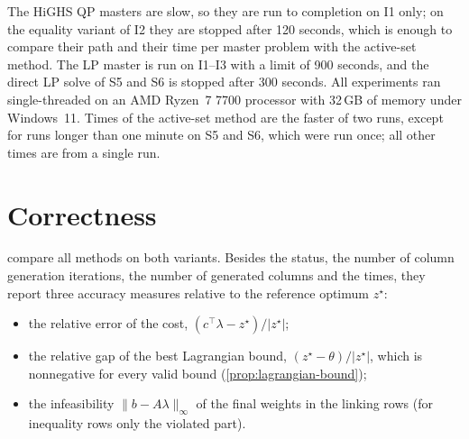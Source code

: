 \medskip

The HiGHS QP masters are slow, so they are run to completion on I1 only; on the equality
variant of I2 they are stopped after 120 seconds, which is enough to compare their path and
their time per master problem with the active-set method. The LP master is run on I1--I3 with
a limit of 900 seconds, and the direct LP solve of S5 and S6 is stopped after 300 seconds. All
experiments ran single-threaded on an AMD Ryzen~7 7700 processor with 32\,GB of memory under
Windows~11. Times of the active-set method are the faster of two runs, except for runs longer
than one minute on S5 and S6, which were run once; all other times are from a single run.


\section{Correctness}
\label{sec:results-correctness}

 compare all methods on both variants. Besides the
status, the number of column generation iterations, the number of generated columns and the
times, they report three accuracy measures relative to the reference optimum $z^\star$:
\begin{itemize}
    \item the relative error of the cost, $(c^\top\lambda - z^\star)/|z^\star|$;
    \item the relative gap of the best Lagrangian bound, $(z^\star - \theta)/|z^\star|$, which
          is nonnegative for every valid bound (\cref{prop:lagrangian-bound});
    \item the infeasibility $\lVert b - A\lambda\rVert_\infty$ of the final weights in the linking
          rows (for inequality rows only the violated part).
\end{itemize}

\begin{table}[!htbp]
\centering
\scriptsize
\renewcommand{\arraystretch}{1.15}
\setlength{\tabcolsep}{4pt}
\caption{Equality variant: all methods. ``time'' denotes a method stopped by its time limit
(120\,s for the HiGHS QP masters on I2). Master times are averages per column generation
iteration.}
\label{tab:comparison-eq}
\end{table}

